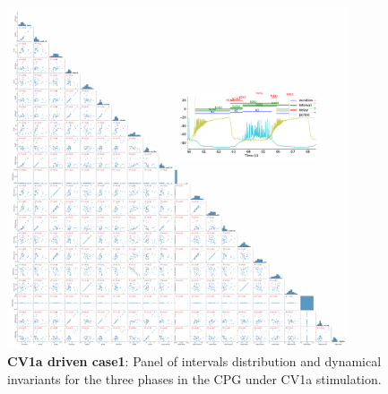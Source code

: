 \begin{figure}[htbp]
	\centering
	\includegraphics[width=0.9\textwidth]{./invariants/data/SUSSEX/CV1a_driven1/images/3phases/panel_with_pairplot.pdf}
	\caption{\textbf{CV1a driven case1}: Panel of intervals distribution and dynamical invariants for the three phases in the CPG under CV1a stimulation.}
	\label{fig:cv1a 1 3phases pairplot}
\end{figure}

